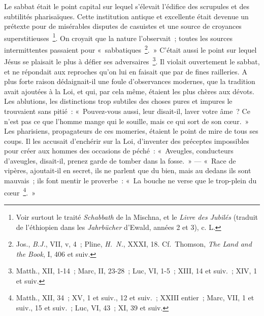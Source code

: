 \documentclass[french,twoside]{book} %
\begin{document}
Le sabbat était le point capital sur lequel s’élevait l’édifice des scrupules et des subtilités pharisaïques. Cette institution antique et excellente était devenue un prétexte pour de misérables disputes de casuistes et une source de croyances superstitieuses \footnote{ Voir surtout le traité {\itshape Schabbath} de la Mischna, et le {\itshape Livre des Jubilés} (traduit de l’éthiopien dans les {\itshape Jahrbücher} d’Ewald, années 2 et 3), c. L.}. On croyait que la nature l’observait ; toutes les sources intermittentes passaient pour « sabbatiques \footnote{ Jos., {\itshape B.J.}, VII, v, 4 ; Pline, {\itshape H. N.}, XXXI, 18. Cf. Thomson, {\itshape The Land and the Book}, I, 406 et suiv.}. » C’était aussi le point sur lequel Jésus se plaisait le plus à défier ses adversaires \footnote{Matth., XII, 1-14 ; Marc, II, 23-28 ; Luc, VI, 1-5 ; XIII, 14 et suiv. ; XIV, 1 et suiv.}. Il violait ouvertement le sabbat, et ne répondait aux reproches qu’on lui en faisait que par de fines railleries. A plus forte raison dédaignait-il une foule d’observances modernes, que la tradition avait ajoutées à la Loi, et qui, par cela même, étaient les plus chères aux dévots. Les ablutions, les distinctions trop subtiles des choses pures et impures le trouvaient sans pitié : « Pouvez-vous aussi, leur disait-il, laver votre âme ? Ce n’est pas ce que l’homme mange qui le souille, mais ce qui sort de son cœur. » Les pharisiens, propagateurs de ces momeries, étaient le point de mire de tous ses coups. Il les accusait d’enchérir sur la Loi, d’inventer des préceptes impossibles pour créer aux hommes des occasions de péché : « Aveugles, conducteurs d’aveugles, disait-il, prenez garde de tomber dans la fosse. » — « Race de vipères, ajoutait-il en secret, ils ne parlent que du bien, mais au dedans ils sont mauvais ; ils font mentir le proverbe : « La bouche ne verse que le trop-plein du cœur \footnote{Matth., XII, 34 ; XV, 1 et suiv., 12 et suiv. ; XXIII entier ; Marc, VII, 1 et suiv., 15 et suiv. ; Luc, VI, 43 ; XI, 39 et suiv.}. »\par
\end{document}
